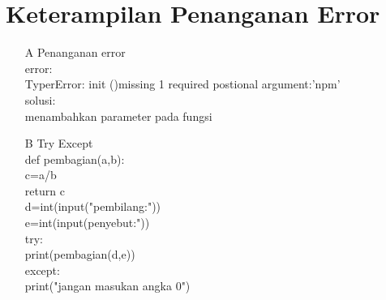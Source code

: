 \chapter{Keterampilan Penanganan Error}
\begin{enumerate}
    \item [A]Penanganan error\\
    error:\\
    TyperError: init ()missing 1 required postional argument:'npm'\\
    solusi:\\
    menambahkan parameter pada fungsi\\
    \item [B]Try Except\\
    def pembagian(a,b):\\
    c=a/b\\
    return c\\
    
    d=int(input("pembilang:"))\\
    e=int(input(penyebut:"))\\
    try:\\
    print(pembagian(d,e))\\
    except:\\
    print("jangan masukan angka 0")
\end{enumerate}










    


